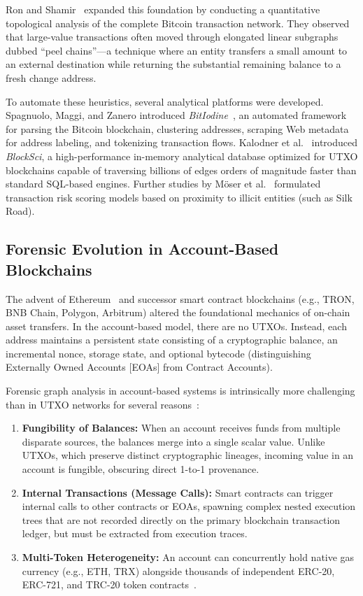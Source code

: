 Ron and Shamir~\cite{ron2013quantitative} expanded this foundation by conducting a quantitative topological analysis of the complete Bitcoin transaction network. They observed that large-value transactions often moved through elongated linear subgraphs dubbed ``peel chains''---a technique where an entity transfers a small amount to an external destination while returning the substantial remaining balance to a fresh change address.

To automate these heuristics, several analytical platforms were developed. Spagnuolo, Maggi, and Zanero introduced \emph{BitIodine}~\cite{spagnuolo2014bitiodine}, an automated framework for parsing the Bitcoin blockchain, clustering addresses, scraping Web metadata for address labeling, and tokenizing transaction flows. Kalodner et al.~\cite{kalodner2020blocksci} introduced \emph{BlockSci}, a high-performance in-memory analytical database optimized for UTXO blockchains capable of traversing billions of edges orders of magnitude faster than standard SQL-based engines. Further studies by M{\"o}ser et al.~\cite{moser2014towards} formulated transaction risk scoring models based on proximity to illicit entities (such as Silk Road).

\subsection{Forensic Evolution in Account-Based Blockchains}

The advent of Ethereum~\cite{wood2014ethereum} and successor smart contract blockchains (e.g., TRON, BNB Chain, Polygon, Arbitrum) altered the foundational mechanics of on-chain asset transfers. In the account-based model, there are no UTXOs. Instead, each address maintains a persistent state consisting of a cryptographic balance, an incremental nonce, storage state, and optional bytecode (distinguishing Externally Owned Accounts [EOAs] from Contract Accounts).

Forensic graph analysis in account-based systems is intrinsically more challenging than in UTXO networks for several reasons~\cite{victor2020address, beres2021blockchain}:
\begin{enumerate}
    \item \textbf{Fungibility of Balances:} When an account receives funds from multiple disparate sources, the balances merge into a single scalar value. Unlike UTXOs, which preserve distinct cryptographic lineages, incoming value in an account is fungible, obscuring direct 1-to-1 provenance.
    \item \textbf{Internal Transactions (Message Calls):} Smart contracts can trigger internal calls to other contracts or EOAs, spawning complex nested execution trees that are not recorded directly on the primary blockchain transaction ledger, but must be extracted from execution traces.
    \item \textbf{Multi-Token Heterogeneity:} An account can concurrently hold native gas currency (e.g., ETH, TRX) alongside thousands of independent ERC-20, ERC-721, and TRC-20 token contracts~\cite{chen2020traveling, wu2021tnet}.
\end{enumerate}

